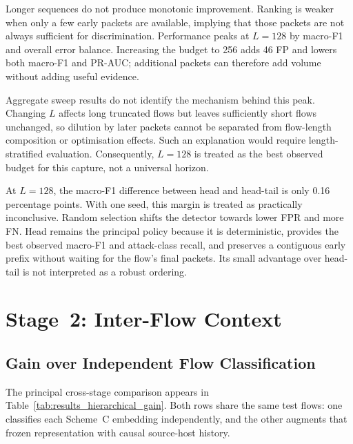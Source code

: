 \documentclass[11pt,fleqn]{report}
\begin{document}
Longer sequences do not produce monotonic improvement. Ranking is weaker when only a few early packets are available, implying that those packets are not always sufficient for discrimination. Performance peaks at $L=128$ by macro-F1 and overall error balance. Increasing the budget to 256 adds 46 FP and lowers both macro-F1 and PR-AUC; additional packets can therefore add volume without adding useful evidence.

Aggregate sweep results do not identify the mechanism behind this peak. Changing $L$ affects long truncated flows but leaves sufficiently short flows unchanged, so dilution by later packets cannot be separated from flow-length composition or optimisation effects. Such an explanation would require length-stratified evaluation. Consequently, $L=128$ is treated as the best observed budget for this capture, not a universal horizon.

At $L=128$, the macro-F1 difference between head and head-tail is only 0.16 percentage points. With one seed, this margin is treated as practically inconclusive. Random selection shifts the detector towards lower FPR and more FN. Head remains the principal policy because it is deterministic, provides the best observed macro-F1 and attack-class recall, and preserves a contiguous early prefix without waiting for the flow's final packets. Its small advantage over head-tail is not interpreted as a robust ordering.

\section{Stage~2: Inter-Flow Context}
\label{subsec:results_stage2}

\subsection{Gain over Independent Flow Classification}
\label{subsubsec:results_hierarchical_gain}

The principal cross-stage comparison appears in Table~\ref{tab:results_hierarchical_gain}. Both rows share the same test flows: one classifies each Scheme~C embedding independently, and the other augments that frozen representation with causal source-host history.
\end{document}
